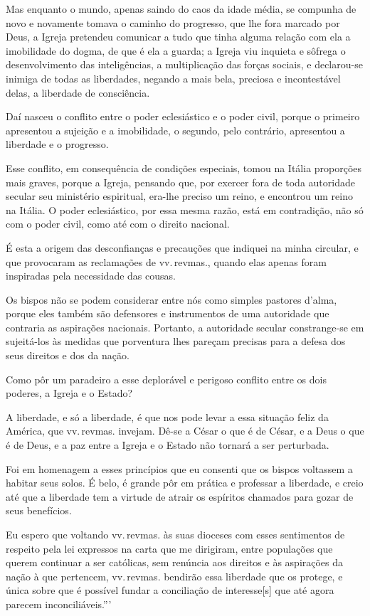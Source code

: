 Mas enquanto o mundo, apenas saindo do caos da idade média, se compunha
de novo e novamente tomava o caminho do progresso, que lhe fora marcado
por Deus, a Igreja pretendeu comunicar a tudo que tinha alguma relação
com ela a imobilidade do dogma, de que é ela a guarda; a Igreja viu
inquieta e sôfrega o desenvolvimento das inteligências, a multiplicação
das forças sociais, e declarou-se inimiga de todas as liberdades,
negando a mais bela, preciosa e incontestável delas, a liberdade de
consciência.

Daí nasceu o conflito entre o poder eclesiástico e o poder civil, porque
o primeiro apresentou a sujeição e a imobilidade, o segundo, pelo
contrário, apresentou a liberdade e o progresso.

Esse conflito, em consequência de condições especiais, tomou na Itália
proporções mais graves, porque a Igreja, pensando que, por exercer fora
de toda autoridade secular seu ministério espiritual, era-lhe preciso um
reino, e encontrou um reino na Itália. O poder eclesiástico, por essa
mesma razão, está em contradição, não só com o poder civil, como até com
o direito nacional.

É esta a origem das desconfianças e precauções que indiquei na minha
circular, e que provocaram as reclamações de vv.\,revmas., quando elas
apenas foram inspiradas pela necessidade das cousas.

Os bispos não se podem considerar entre nós como simples pastores
d'alma, porque eles também são defensores e instrumentos de uma
autoridade que contraria as aspirações nacionais. Portanto, a autoridade
secular constrange-se em sujeitá-los às medidas que porventura lhes
pareçam precisas para a defesa dos seus direitos e dos da nação.

Como pôr um paradeiro a esse deplorável e perigoso conflito entre os
dois poderes, a Igreja e o Estado?

A liberdade, e só a liberdade, é que nos pode levar a essa situação
feliz da América, que vv.\,revmas. invejam. Dê-se a César o que é de
César, e a Deus o que é de Deus, e a paz entre a Igreja e o Estado não
tornará a ser perturbada.

Foi em homenagem a esses princípios que eu consenti que os bispos
voltassem a habitar seus solos. É belo, é grande pôr em prática e
professar a liberdade, e creio até que a liberdade tem a virtude de
atrair os espíritos chamados para gozar de seus benefícios.

Eu espero que voltando vv.\,revmas. às suas dioceses com esses
sentimentos de respeito pela lei expressos na carta que me dirigiram,
entre populações que querem continuar a ser católicas, sem renúncia aos
direitos e às aspirações da nação à que pertencem, vv.\,revmas. bendirão
essa liberdade que os protege, e única sobre que é possível fundar a
conciliação de interesse{[}s{]} que até agora parecem inconciliáveis.'''

